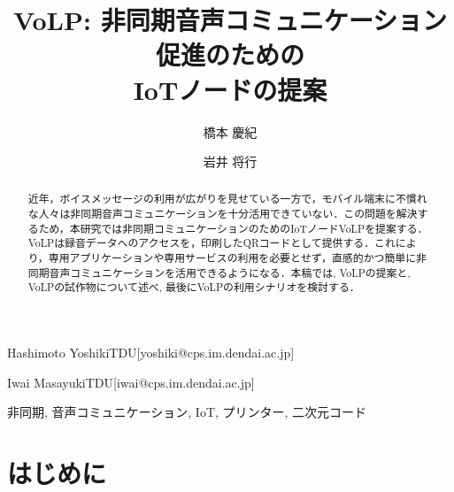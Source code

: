 \documentclass[submit,techrep,noauthor]{ipsj}
\begin{document}
\title{VoLP: 非同期音声コミュニケーション促進のための\\IoTノードの提案}

\author{橋本 慶紀}{Hashimoto Yoshiki}{TDU}[yoshiki@cps.im.dendai.ac.jp]
\author{岩井 将行}{Iwai Masayuki}{TDU}[iwai@cps.im.dendai.ac.jp]

\begin{abstract}
近年，ボイスメッセージの利用が広がりを見せている一方で，モバイル端末に不慣れな人々は非同期音声コミュニケーションを十分活用できていない．この問題を解決するため，本研究では非同期コミュニケーションのためのIoTノードVoLPを提案する．VoLPは録音データへのアクセスを，印刷したQRコードとして提供する．これにより，専用アプリケーションや専用サービスの利用を必要とせず，直感的かつ簡単に非同期音声コミュニケーションを活用できるようになる．本稿では, VoLPの提案と, VoLPの試作物について述べ, 最後にVoLPの利用シナリオを検討する．

\end{abstract}

\begin{jkeyword}
非同期, 音声コミュニケーション, IoT, プリンター, 二次元コード
\end{jkeyword}

\maketitle

\section{はじめに}
\end{document}
